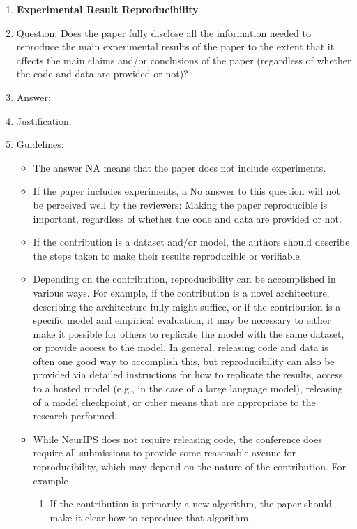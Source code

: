 \documentclass{article}
\begin{document}
\begin{enumerate}
    \item {\bf Experimental Result Reproducibility}
    \item[] Question: Does the paper fully disclose all the information needed to reproduce the main experimental results of the paper to the extent that it affects the main claims and/or conclusions of the paper (regardless of whether the code and data are provided or not)?
    \item[] Answer: \answerTODO{} %
    \item[] Justification: \justificationTODO{}
    \item[] Guidelines:
    \begin{itemize}
        \item The answer NA means that the paper does not include experiments.
        \item If the paper includes experiments, a No answer to this question will not be perceived well by the reviewers: Making the paper reproducible is important, regardless of whether the code and data are provided or not.
        \item If the contribution is a dataset and/or model, the authors should describe the steps taken to make their results reproducible or verifiable. 
        \item Depending on the contribution, reproducibility can be accomplished in various ways. For example, if the contribution is a novel architecture, describing the architecture fully might suffice, or if the contribution is a specific model and empirical evaluation, it may be necessary to either make it possible for others to replicate the model with the same dataset, or provide access to the model. In general. releasing code and data is often one good way to accomplish this, but reproducibility can also be provided via detailed instructions for how to replicate the results, access to a hosted model (e.g., in the case of a large language model), releasing of a model checkpoint, or other means that are appropriate to the research performed.
        \item While NeurIPS does not require releasing code, the conference does require all submissions to provide some reasonable avenue for reproducibility, which may depend on the nature of the contribution. For example
        \begin{enumerate}
            \item If the contribution is primarily a new algorithm, the paper should make it clear how to reproduce that algorithm.

\end{enumerate}
\end{itemize}
\end{enumerate}
\end{document}
